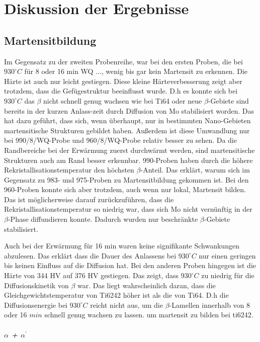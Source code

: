 \chapter{Diskussion der Ergebnisse}

\section{Martensitbildung}


Im Gegensatz zu der zweiten Probenreihe, war  bei den ersten Proben, die bei $930^\circ C$ für 8   oder 16 min WQ ..., wenig bis gar kein Martensit zu erkennen. Die Härte ist auch nur leicht gestiegen. Diese kleine Härteverbesserung zeigt aber trotzdem, dass  die Gefügestruktur  beeinflusst wurde. D.h es konnte sich bei $930^\circ C$ das $\beta$ nicht schnell genug wachsen wie bei Ti64 oder neue $\beta$-Gebiete sind bereits in der kurzen Anlass-zeit  durch Diffusion von Mo stabilisiert worden. 
Das hat dazu geführt, dass sich, wenn überhaupt, nur in bestimmten Nano-Gebieten martensitische Strukturen gebildet haben. Außerdem ist diese Umwandlung nur bei  990/8/WQ-Probe und 960/8/WQ-Probe relativ besser zu sehen. Da die Randbereiche bei der Erwärmung zuerst durchwärmt werden, sind martensitische Strukturen auch am Rand besser erkennbar.
990-Proben haben durch die höhere Rekristallisationstemperatur den höchsten $\beta$-Anteil. Das erklärt, warum sich im Gegensatz zu 983- und 975-Proben zu Martensitbildung gekommen ist.
Bei den 960-Proben konnte sich aber trotzdem, auch wenn nur  lokal, Martensit bilden. Das ist möglicherweise darauf zurückzuführen, dass die Rekristallisationstemperatur  so niedrig war, dass sich Mo nicht vernünftig  in der $\beta$-Phase diffundieren konnte. Dadurch wurden nur beschränkte $\beta$-Gebiete stabilisiert.

Auch bei der Erwärmung für 16 min waren keine signifikante Schwankungen abzulesen. Das erklärt dass die Dauer des Anlassens bei $930^\circ C$ nur einen geringen bis keinen Einfluss auf die Diffusion  hat. 
Bei den anderen Proben hingegen ist die Härte von 344 HV auf 376 HV gestiegen. 
Das zeigt, dass $930^\circ C$ zu niedrig  für die Diffusionskinetik von $\beta$ war. Das liegt wahrscheinlich daran, dass die Gleichgewichtstemperatur von Ti6242 höher ist als die von Ti64. D.h die  Diffusionsenergie bei $930^\circ C$ reicht nicht aus, um die  $\beta$-Lamellen innerhalb von 8 oder 16 $min$ schnell genug wachsen zu lassen. um martensit zu bilden bei ti6242.

\paragraph{$\alpha$ + $\alpha^\prime$}


